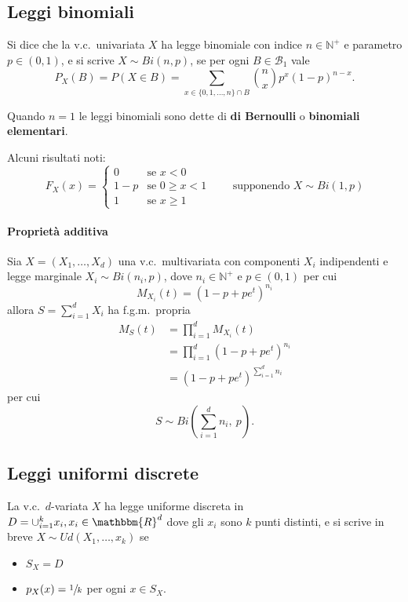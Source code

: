\documentclass[11pt,a4paper,twoside]{article}
\let\geq\geqslant%
\newcommand\N{\mathbb{N}}
\newcommand\R{\mathbbm{R}}
\newcommand\B{\mathcal{B}}
\newcommand\smallsum{\textstyle\sum}
\begin{document}
\subsection{Leggi binomiali}
Si dice che la v.c.\ univariata \(X\) ha legge binomiale con indice
\(n \in \N^+\) e parametro \(p\in (0,1)\), e si scrive \(X\sim Bi(n,
p)\), se per ogni \(B \in \B_1\) vale
\[
  P_X(B) = P(X\in B) = \sum_{x\in\{0,1,\dots,n\}\cap B} {n\choose x}p^x(1-p)^{n-x}.
\]

Quando \(n = 1\) le leggi binomiali sono dette di \textbf{di
  Bernoulli} o \textbf{binomiali elementari}.

Alcuni risultati noti:
\[
  F_X(x) = \begin{cases}
    0   & \mbox{se } x < 0 \\
    1-p & \mbox{se } 0\geq x < 1 \\
    1   & \mbox{se } x\geq 1
  \end{cases}\qquad\mbox{supponendo } X\sim Bi(1, p)
\]

\paragraph{Proprietà additiva}
Sia \(X = (X_1, \dots, X_d)\) una v.c.\ multivariata con componenti
\(X_i\) indipendenti e legge marginale \(X_i\sim Bi(n_i, p)\), dove
\(n_i \in \N^+\) e \(p \in (0,1)\) per cui
\[
  M_{X_i}(t) = \left( 1 - p + pe^t\right)^{n_i}
\]
allora \(S = \sum_{i=1}^d X_i\) ha f.g.m.\ propria
\begin{align*}
  M_S(t) &= \prod_{i=1}^d M_{X_i}(t) \\
         &= \prod_{i=1}^d \left( 1-p+pe^t \right)^{n_i} \\
         &= \left( 1 - p + pe^t \right)^{\sum_{i=1}^d n_i}
\end{align*}
per cui
\[
  S \sim Bi\left( \smallsum_{i=1}^d n_i, \: p \right).
\]

\subsection{Leggi uniformi discrete}
La v.c.\ \(d\)-variata \(X\) ha legge uniforme discreta in \(D =
\cup_{i=1}^k{x_i}, x_i\in \R^d\) dove gli \(x_i\) sono \(k\) punti
distinti, e si scrive in breve \(X\sim Ud(X_1,\dots, x_k)\) se
\begin{itemize}
\item \(S_X = D\)
\item \(p_X(
  x) = \sfrac{1}{k}\) per ogni \(x \in S_X\).
\end{itemize}
\end{document}
